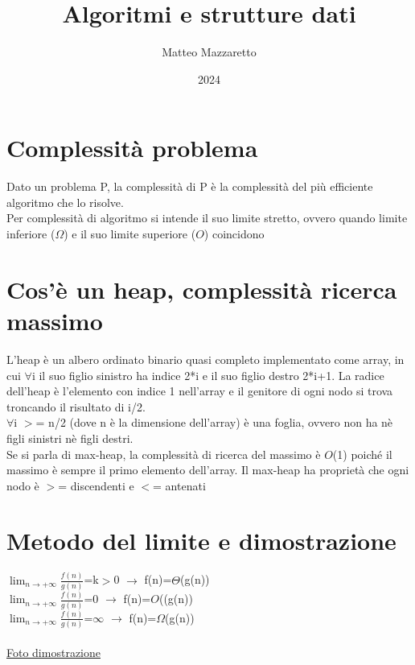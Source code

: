 \documentclass[12pt,oneside,a4paper]{article}
\title{Algoritmi e strutture dati}
\author{Matteo Mazzaretto}
\date{2024}
\newcommand\Omicron{O}
\begin{document}
\maketitle
\begin{center}
\renewcommand{\contentsname}{Indice}
\tableofcontents
\end{center}
\newpage
\setcounter{page}{1}
\section{Complessità problema}
Dato un problema P, la complessità di P è la complessità del più efficiente algoritmo che lo risolve.\\
Per complessità di algoritmo si intende il suo limite stretto, ovvero quando limite inferiore ($\Omega$) e il suo limite superiore ($\Omicron$) coincidono
\section{Cos'è un heap, complessità ricerca massimo}
L'heap è un albero ordinato binario quasi completo implementato come array, in cui $\forall$i il suo figlio sinistro ha indice 2*i e il suo figlio destro 2*i+1. La radice dell'heap è l'elemento con indice 1 nell'array e il genitore di ogni nodo si trova troncando il risultato di i/2.\\
$\forall$i $>$= n/2 (dove n è la dimensione dell'array) è una foglia, ovvero non ha nè figli sinistri nè figli destri.\\
Se si parla di max-heap, la complessità di ricerca del massimo è  $\Omicron$(1) poiché il massimo è sempre il primo elemento dell'array. Il max-heap ha proprietà che ogni nodo è $>$= discendenti e $<$= antenati
\section{Metodo del limite e dimostrazione}
$\lim_{n\to +\infty}$$\frac{f(n)}{g(n)}$=k$>$0 $\to$ f(n)=$\Theta$(g(n))
\\
$\lim_{n\to +\infty}$$\frac{f(n)}{g(n)}$=0 $\to$ f(n)=$\Omicron$((g(n))
\\
$\lim_{n\to +\infty}$$\frac{f(n)}{g(n)}$=$\infty$ $\to$ f(n)=$\Omega$(g(n))
\\\\
\href{limite.pdf}{Foto dimostrazione}
\end{document}
